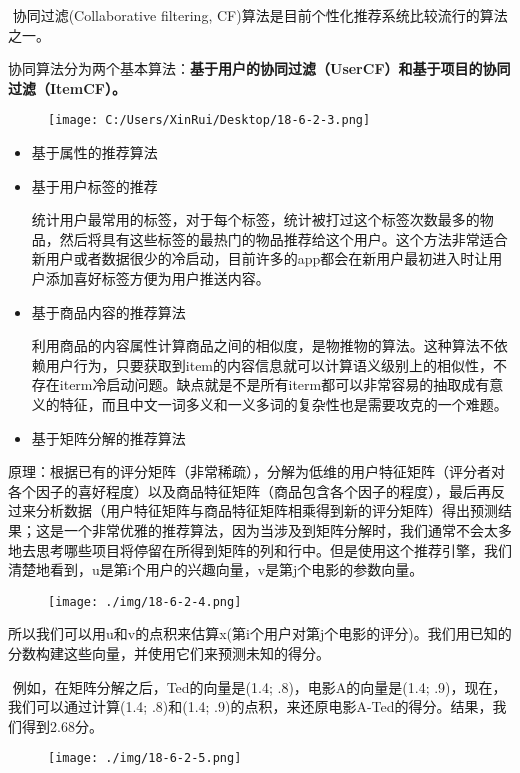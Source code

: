 ​ 协同过滤(Collaborative filtering,
CF)算法是目前个性化推荐系统比较流行的算法之一。

​
协同算法分为两个基本算法：\textbf{基于用户的协同过滤（UserCF）和基于项目的协同过滤（ItemCF）。}

\begin{figure}
\centering
\texttt{[image: C:/Users/XinRui/Desktop/18-6-2-3.png]}
\caption{}
\end{figure}

\begin{itemize}
\item
  基于属性的推荐算法
\item
  基于用户标签的推荐

  ​
  统计用户最常用的标签，对于每个标签，统计被打过这个标签次数最多的物品，然后将具有这些标签的最热门的物品推荐给这个用户。这个方法非常适合新用户或者数据很少的冷启动，目前许多的app都会在新用户最初进入时让用户添加喜好标签方便为用户推送内容。
\item
  基于商品内容的推荐算法

  ​
  利用商品的内容属性计算商品之间的相似度，是物推物的算法。这种算法不依赖用户行为，只要获取到item的内容信息就可以计算语义级别上的相似性，不存在iterm冷启动问题。缺点就是不是所有iterm都可以非常容易的抽取成有意义的特征，而且中文一词多义和一义多词的复杂性也是需要攻克的一个难题。
\item
  基于矩阵分解的推荐算法
\end{itemize}

​
原理：根据已有的评分矩阵（非常稀疏），分解为低维的用户特征矩阵（评分者对各个因子的喜好程度）以及商品特征矩阵（商品包含各个因子的程度），最后再反过来分析数据（用户特征矩阵与商品特征矩阵相乘得到新的评分矩阵）得出预测结果；这是一个非常优雅的推荐算法，因为当涉及到矩阵分解时，我们通常不会太多地去思考哪些项目将停留在所得到矩阵的列和行中。但是使用这个推荐引擎，我们清楚地看到，u是第i个用户的兴趣向量，v是第j个电影的参数向量。

\begin{figure}
\centering
\texttt{[image: ./img/18-6-2-4.png]}
\caption{}
\end{figure}

​
所以我们可以用u和v的点积来估算x(第i个用户对第j个电影的评分)。我们用已知的分数构建这些向量，并使用它们来预测未知的得分。

​ 例如，在矩阵分解之后，Ted的向量是(1.4; .8)，电影A的向量是(1.4;
.9)，现在，我们可以通过计算(1.4; .8)和(1.4;
.9)的点积，来还原电影A-Ted的得分。结果，我们得到2.68分。

\begin{figure}
\centering
\texttt{[image: ./img/18-6-2-5.png]}
\caption{}
\end{figure}

